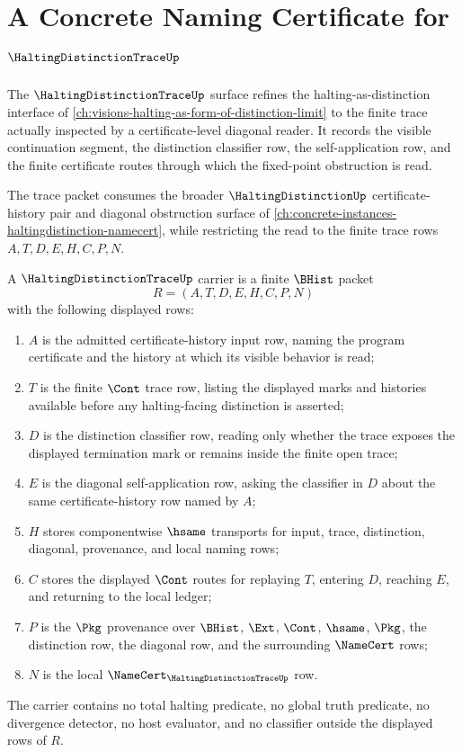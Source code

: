 \chapter{A Concrete Naming Certificate for $\HaltingDistinctionTraceUp$}
\label{ch:concrete-instances-haltingdistinctiontrace-namecert}

The $\HaltingDistinctionTraceUp$ surface refines the halting-as-distinction interface of \autoref{ch:visions-halting-as-form-of-distinction-limit} to the finite trace actually inspected by a certificate-level diagonal reader. It records the visible continuation segment, the distinction classifier row, the self-application row, and the finite certificate routes through which the fixed-point obstruction is read.

The trace packet consumes the broader $\HaltingDistinctionUp$ certificate-history pair and diagonal obstruction surface of \autoref{ch:concrete-instances-haltingdistinction-namecert}, while restricting the read to the finite trace rows $A,T,D,E,H,C,P,N$.

\begin{definition}
\label{def:halting-distinction-trace-carrier}
A $\HaltingDistinctionTraceUp$ carrier is a finite $\BHist$ packet
$$
R=(A,T,D,E,H,C,P,N)
$$
with the following displayed rows:
\begin{enumerate}
\item $A$ is the admitted certificate-history input row, naming the program certificate and the history at which its visible behavior is read;
\item $T$ is the finite $\Cont$ trace row, listing the displayed marks and histories available before any halting-facing distinction is asserted;
\item $D$ is the distinction classifier row, reading only whether the trace exposes the displayed termination mark or remains inside the finite open trace;
\item $E$ is the diagonal self-application row, asking the classifier in $D$ about the same certificate-history row named by $A$;
\item $H$ stores componentwise $\hsame$ transports for input, trace, distinction, diagonal, provenance, and local naming rows;
\item $C$ stores the displayed $\Cont$ routes for replaying $T$, entering $D$, reaching $E$, and returning to the local ledger;
\item $P$ is the $\Pkg$ provenance over $\BHist$, $\Ext$, $\Cont$, $\hsame$, $\Pkg$, the distinction row, the diagonal row, and the surrounding $\NameCert$ rows;
\item $N$ is the local $\NameCert_{\HaltingDistinctionTraceUp}$ row.
\end{enumerate}
The carrier contains no total halting predicate, no global truth predicate, no divergence detector, no host evaluator, and no classifier outside the displayed rows of $R$.
\end{definition}

